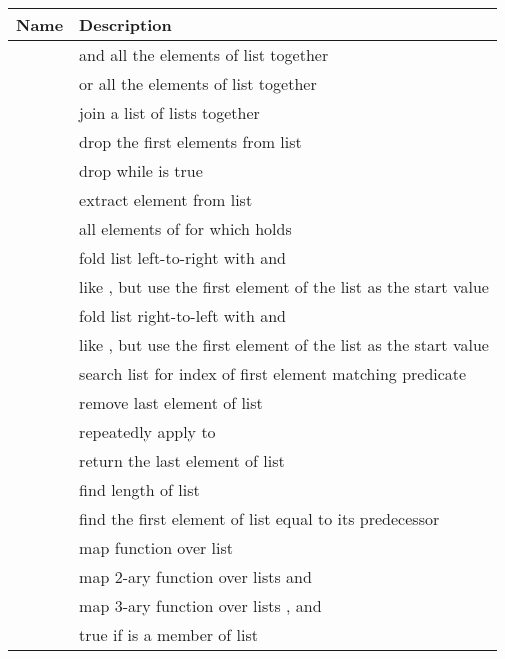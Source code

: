 \begin{tab2}
\begin{center}
\begin{tabular}{||l|l||}
\hline
Name & Description \\
\hline
\ct{all l} 		& and all the elements of list \ct{l} together \\
\ct{any l} 		& or all the elements of list \ct{l} together \\
\ct{concat l} 		& join a list of lists together \\
\ct{drop n l} 		& drop the first \ct{n} elements from list \ct{l} \\
\ct{dropwhile fn l} 	& drop while \ct{fn} is true \\
\ct{extract n l} 	& extract element \ct{n} from list \ct{l} \\
\ct{filter fn l} 	& all elements of \ct{l} for which \ct{fn} holds \\
\ct{foldl fn st l} 	& fold list \ct{l} left-to-right with \ct{fn} 
			  and \ct{st} \\
\ct{foldl1 fn l} 	& like \ct{foldl}, but use the first element of the 
			  list as the start value \\
\ct{foldr fn st l} 	& fold list \ct{l} right-to-left with \ct{fn} 
			  and \ct{st} \\
\ct{foldr1 fn l} 	& like \ct{foldr}, but use the first element of the 
			  list as the start value \\
\ct{index fn l} 	& search list \ct{l} for index of first element 
			  matching predicate \ct{fn} \\
\ct{init l} 		& remove last element of list \ct{l} \\
\ct{iterate f x} 	& repeatedly apply \ct{f} to \ct{x} \\
\ct{last l} 		& return the last element of list \ct{l} \\
\ct{len l} 		& find length of list \ct{l} \\
\ct{limit l}		& find the first element of list \ct{l} equal to
			  its predecessor \\
\ct{map fn l} 		& map function \ct{fn} over list \ct{l} \\
\ct{map2 fn l1 l2} 	& map 2-ary function \ct{fn} over lists \ct{l1}
		 	  and \ct{l2} \\
\ct{map3 fn l1 l2 l3} 	& map 3-ary function \ct{fn} over lists \ct{l1},
		 	  \ct{l2} and \ct{l3} \\
\ct{member l x}		& true if \ct{x} is a member of list \ct{l} \\

\end{tabular}
\end{center}
\end{tab2}
